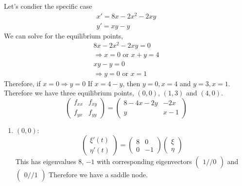 \documentclass{article}
\begin{document}
\begin{eg}
    Let's condier the specific case
    \begin{align*}
        x' = 8x - 2x^2 - 2xy \\
        y' = xy - y
    \end{align*}
    We can solve for the equilibrium points,
    \begin{align*}
        8x - 2x^2 - 2xy = 0 \\
        \Rightarrow x = 0 \text{ or } x + y = 4 \\
        xy - y = 0 \\
        \Rightarrow y = 0 \text{ or } x = 1
    \end{align*}
    Therefore, if $x = 0 \Rightarrow y = 0$
    If $x = 4 - y$, then $y=0, x = 4$ and $y = 3, x = 1$.
    Therefore we have three equilibrium points, $(0,0)$, $(1, 3)$ and $(4, 0)$.
    \[
        \begin{pmatrix}
            f_{xx} & f_{xy} \\
            f_{yx} & f_{yy}
        \end{pmatrix} = \begin{pmatrix}
            8 - 4x - 2y & -2x \\
            y & x-1
        \end{pmatrix}
    \]
    \begin{enumerate}[cases]
        \item $(0,0)$:
        \[
            \begin{pmatrix}
                \xi'(t) \\ \eta'(t)
            \end{pmatrix} = \begin{pmatrix}
                8 & 0 \\
                0 & -1
            \end{pmatrix} \begin{pmatrix}
                \xi \\ \eta
            \end{pmatrix}
        \]
        This has eigenvalues $8$, $-1$ with corresponding eigenvectors $\begin{pmatrix}
            1 // 0
        \end{pmatrix}$ and $\begin{pmatrix}
            0 // 1
        \end{pmatrix}$
        Therefore we have a saddle node.


\end{enumerate}
\end{eg}
\end{document}
